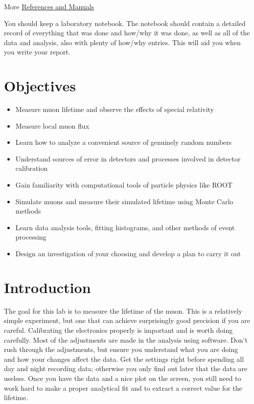 \documentclass{../lab}
\begin{document}
More \hyperref[sec:References]{References and Manuals}

You should keep a laboratory notebook. The notebook should contain a detailed record of everything that was done and how/why it was done, as well as all of the data and analysis, also with plenty of how/why entries. This will aid you when you write your report.

\section{Objectives}

\begin{itemize}
    \item Measure muon lifetime and observe the effects of special relativity

    \item Measure local muon flux

    \item Learn how to analyze a convenient source of genuinely random numbers

    \item Understand sources of error in detectors and processes involved in detector calibration

    \item Gain familiarity with computational tools of particle physics like ROOT

    \item Simulate muons and measure their simulated lifetime using Monte Carlo methods

    \item Learn data analysis tools, fitting histograms, and other methods of event processing

    \item Design an investigation of your choosing and develop a plan to carry it out
\end{itemize}

\section{Introduction}

The goal for this lab is to measure the lifetime of the muon. This is a relatively simple experiment, but one that can achieve surprisingly good precision if you are careful. Calibrating the electronics properly is important and is worth doing carefully. Most of the adjustments are made in the analysis using software. Don't rush through the adjustments, but ensure you understand what you are doing and how your changes affect the data. Get the settings right before spending all day and night recording data; otherwise you only find out later that the data are useless. Once you have the data and a nice plot on the screen, you still need to work hard to make a proper analytical fit and to extract a correct value for the lifetime.
\end{document}

